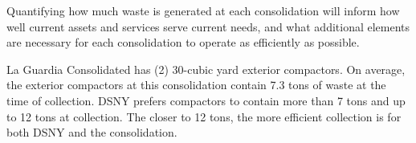 
    Quantifying how much waste is generated at each consolidation will inform how well current assets and services serve current needs, and what additional elements are necessary for each consolidation to operate as efficiently as possible.
    
    La Guardia Consolidated has (2) 30-cubic yard exterior compactors. On average, the exterior compactors at this consolidation contain 7.3 tons of waste at the time of collection. DSNY prefers compactors to contain more than 7 tons and up to 12 tons at collection. The closer to 12 tons, the more efficient collection is for both DSNY and the consolidation.